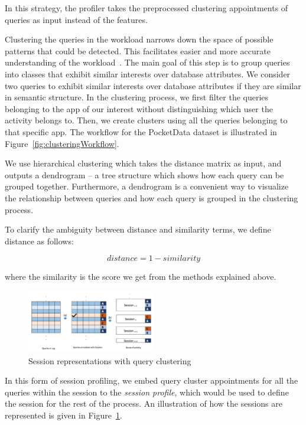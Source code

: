  In this strategy, the profiler takes the preprocessed clustering appointments of queries as input instead of the features.

Clustering the queries in the workload narrows down the space of possible patterns that could be detected. This facilitates easier and more accurate understanding of the workload~\cite{pavlo2017self}. The main goal of this step is to group queries into classes that exhibit similar interests over database attributes. We consider two queries to exhibit similar interests over database attributes if they are similar in semantic structure. In the clustering process, we first filter the queries belonging to the app of our interest without distinguishing which user the activity belongs to. Then, we create clusters using all the queries belonging to that specific app. The workflow for the PocketData dataset is illustrated in Figure~\ref{fig:clusteringWorkflow}.

We use hierarchical clustering
which takes the distance matrix as input, and outputs a dendrogram -- a tree structure which shows how each query can be grouped together.
Furthermore, a dendrogram is a convenient way to visualize the relationship between queries and how each query is grouped in the clustering process.

To clarify the ambiguity between distance and similarity terms, we define distance as follows:

$$distance = 1 - similarity$$

where the similarity is the score we get from the methods explained above. 

\begin{figure}[h!]
    \centering
    \includegraphics[width=0.5\textwidth]{graphics/systemoutline}
    \caption{Session representations with query clustering}
    \label{fig:clusterSession}
\end{figure}

In this form of session profiling, we embed query cluster appointments for all the queries within the session to the \emph{session profile}, which would be used to define the session for the rest of the process. An illustration of how the sessions are represented is given in Figure~\ref{fig:clusterSession}.




